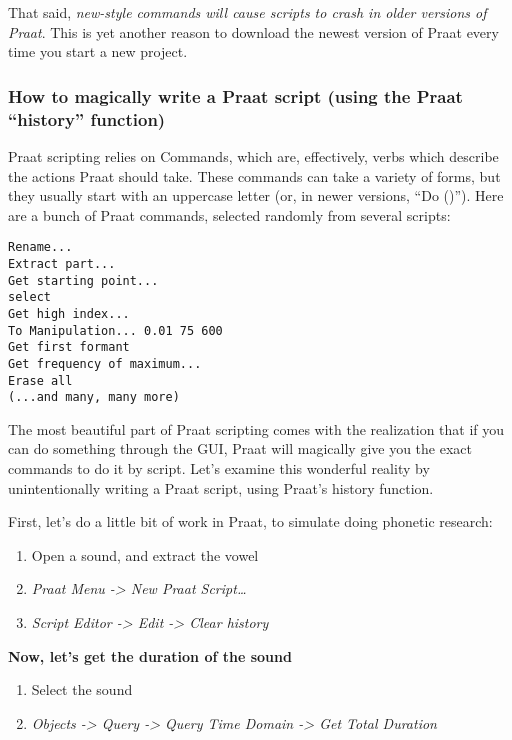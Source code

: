 That said, \emph{new-style commands will cause scripts to crash in older
versions of Praat}. This is yet another reason to download the newest
version of Praat every time you start a new project.

\hypertarget{how-to-magically-write-a-praat-script-using-the-praat-history-function}{%
\subsubsection{How to magically write a Praat script (using the Praat
``history''
function)}\label{how-to-magically-write-a-praat-script-using-the-praat-history-function}}

Praat scripting relies on Commands, which are, effectively, verbs which
describe the actions Praat should take. These commands can take a
variety of forms, but they usually start with an uppercase letter (or,
in newer versions, ``Do ()''). Here are a bunch of Praat commands,
selected randomly from several scripts:

\begin{verbatim} 
Rename...
Extract part...
Get starting point...
select
Get high index...
To Manipulation... 0.01 75 600
Get first formant
Get frequency of maximum...
Erase all
(...and many, many more)
\end{verbatim}

The most beautiful part of Praat scripting comes with the realization
that if you can do something through the GUI, Praat will magically give
you the exact commands to do it by script. Let's examine this wonderful
reality by unintentionally writing a Praat script, using Praat's history
function.

First, let's do a little bit of work in Praat, to simulate doing
phonetic research:

\begin{enumerate}
\def\labelenumi{\arabic{enumi}.}
\tightlist
\item
  Open a sound, and extract the vowel
\item
  \emph{Praat Menu -\textgreater{} New Praat Script\ldots{}}
\item
  \emph{Script Editor -\textgreater{} Edit -\textgreater{} Clear
  history}
\end{enumerate}

\textbf{Now, let's get the duration of the sound}

\begin{enumerate}
\def\labelenumi{\arabic{enumi}.}
\setcounter{enumi}{3}
\tightlist
\item
  Select the sound
\item
  \emph{Objects -\textgreater{} Query -\textgreater{} Query Time Domain
  -\textgreater{} Get Total Duration}
\end{enumerate}

